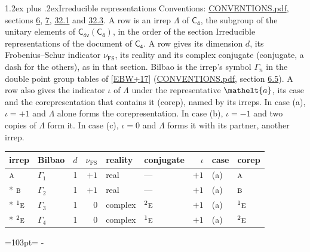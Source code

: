 \documentclass[10pt,a4paper]{article}
\makeatletter
\renewcommand\section{\@startsection{section}{1}{\z@}{-3ex plus -1ex minus -.2ex}%
  {1.2ex plus .2ex}{\normalfont\large\sffamily\bfseries\color{parttitle}}}
\newcommand{\needspace}[1]{\par\penalty-100\begingroup\dimen0=#1\relax\dimen2=\pagegoal
  \advance\dimen2-\pagetotal\ifdim\dimen0>\dimen2\relax\ifdim\dimen2>0pt\vfil\break\fi\fi
  \endgroup}
\numberwithin{equation}{section}
\newcommand{\eltfont}[1]{{\let\sigma\eltsigma\mathelt{#1}}}
\newcommand{\grp}[1]{\mathsf{#1}}
\newcommand{\irr}[1]{\text{\normalfont\scshape #1}}
\newcommand{\conjpair}[1]{{}^{#1}}
\newcommand{\elt}[1]{\eltfont{#1}}
\newcommand{\fsind}{\nu_{\mathrm{FS}}}
\makeatother
\begin{document}
\section{Irreducible representations}\label{s:irreps}
Conventions: \href{../../CONVENTIONS.pdf}{CONVENTIONS.pdf}, sections \href{../../../rotation/CONVENTIONS.pdf\#conv.6}{6}, \href{../../../rotation/CONVENTIONS.pdf\#conv.7}{7}, \href{../../CONVENTIONS.pdf\#conv.32.1}{32.1} and \href{../../CONVENTIONS.pdf\#conv.32.3}{32.3}.
\leavevmode\label{n:irrep.Delta}A row is an irrep $\Lambda$ of $\grp{C_{4}}$, the subgroup of the unitary elements of $\grp{C_{4v}}(\grp{C_{4}})$, in the order of the section Irreducible representations of the document of \href{../../../rotation/data/pdf/C4.pdf}{$\grp{C_{4}}$}. \label{n:index.dimension}\label{n:index.frobenius}\label{n:head.irrep}\label{n:head.reality}\label{n:head.conjugate}A row gives its dimension $d$, its Frobenius--Schur indicator $\fsind$, its reality and its complex conjugate (conjugate, a dash for the others), as in that section. \label{n:head.bilbao}\label{n:irrep.alias.gamma}Bilbao is the irrep's symbol $\Gamma_n$ in the double point group tables of [\href{../../../REFERENCES.pdf\#ref.EBW+17}{EBW+17}] (\href{../../CONVENTIONS.pdf}{CONVENTIONS.pdf}, section \href{../../../rotation/CONVENTIONS.pdf\#conv.6.5}{6.5}). \label{n:head.case.corep}\label{n:head.corep}A row also gives the indicator $\iota$ of $\Lambda$ under the representative $\elt{a}$, its case and the corepresentation that contains it (corep), named by its irreps. In case (a), $\iota = +1$ and $\Lambda$ alone forms the corepresentation. In case (b), $\iota = -1$ and two copies of $\Lambda$ form it. In case (c), $\iota = 0$ and $\Lambda$ forms it with its partner, another irrep.
\setlength{\emergencystretch}{2em}\par\setlength{\emergencystretch}{0pt}
{\small\renewcommand{\arraystretch}{1.25}\setlength{\tabcolsep}{4pt}\begin{longtable}{@{}llrrllrll@{}}\toprule
irrep & Bilbao & $d$ & $\fsind$ & reality & conjugate & $\iota$ & case & corep\\\midrule\endhead
\bottomrule\endfoot\endlastfoot
$\irr{a}$ & $\Gamma_{1}$ & 1 & $+1$ & real & --- & $+1$ & (a) & $\irr{a}$\\*
$\irr{b}$ & $\Gamma_{2}$ & 1 & $+1$ & real & --- & $+1$ & (a) & $\irr{b}$\\*
$\conjpair{1}\irr{e}$ & $\Gamma_{3}$ & 1 & $0$ & complex & $\conjpair{2}\irr{e}$ & $+1$ & (a) & $\conjpair{1}\irr{e}$\\*
$\conjpair{2}\irr{e}$ & $\Gamma_{4}$ & 1 & $0$ & complex & $\conjpair{1}\irr{e}$ & $+1$ & (a) & $\conjpair{2}\irr{e}$\\
\bottomrule\end{longtable}}
\needspace{103pt}
\end{document}

